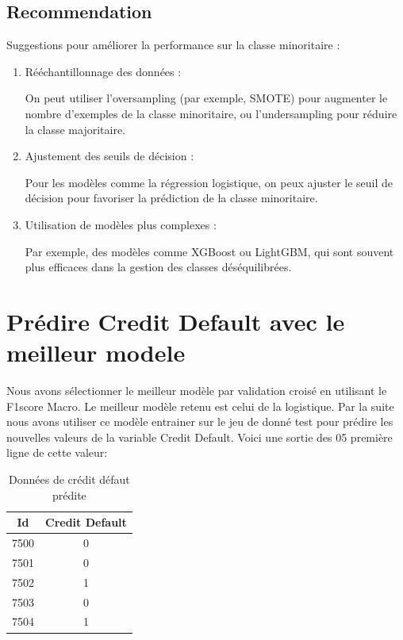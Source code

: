 \subsection{Recommendation}
Suggestions pour améliorer la performance sur la classe minoritaire :
\begin{enumerate}
\item Rééchantillonnage des données :

On peut utiliser l'oversampling (par exemple, SMOTE) pour augmenter le nombre d'exemples de la classe minoritaire, ou l'undersampling pour réduire la classe majoritaire.

\item Ajustement des seuils de décision :

Pour les modèles comme la régression logistique, on peux ajuster le seuil de décision pour favoriser la prédiction de la classe minoritaire.

\item Utilisation de modèles plus complexes :

Par exemple, des modèles comme XGBoost ou LightGBM, qui sont souvent plus efficaces dans la gestion des classes déséquilibrées.
\end{enumerate}

\section{ Prédire Credit Default avec le meilleur modele}
\begin{flushleft}
Nous avons sélectionner le meilleur modèle par validation croisé en utilisant le F1\-score Macro.
Le meilleur modèle retenu est celui de la  logistique. Par la suite nous avons utiliser ce modèle entrainer sur le jeu de donné test pour prédire les nouvelles valeurs de la variable Credit Default. Voici une sortie des 05 première ligne de cette valeur:
\end{flushleft}

\begin{table}[h]
\centering
\caption{Données de crédit défaut prédite}
\label{tab:credit_default}
\begin{tabular}{|c|c|}
\hline
\textbf{Id} & \textbf{Credit Default} \\ \hline
7500 & 0 \\ \hline
7501 & 0 \\ \hline
7502 & 1 \\ \hline
7503 & 0 \\ \hline
7504 & 1 \\ \hline
\end{tabular}
\end{table}

